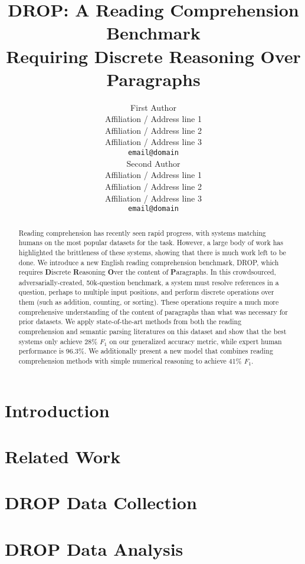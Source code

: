 \documentclass[11pt,a4paper]{article}
\title{DROP: A Reading Comprehension Benchmark \\ Requiring
Discrete Reasoning Over Paragraphs}
\author{First Author \\
  Affiliation / Address line 1 \\
  Affiliation / Address line 2 \\
  Affiliation / Address line 3 \\
  {\tt email@domain} \\\And
  Second Author \\
  Affiliation / Address line 1 \\
  Affiliation / Address line 2 \\
  Affiliation / Address line 3 \\
  {\tt email@domain} \\}
\date{}
\begin{document}
\maketitle
\begin{abstract}

  Reading comprehension has recently seen rapid progress, with systems matching humans on the most popular datasets for the task.  However, a large body of work has highlighted the brittleness of these systems, showing that there is much work left to be done.  We introduce a new English reading comprehension benchmark, DROP, which requires {\bf D}iscrete {\bf R}easoning {\bf O}ver the content of {\bf P}aragraphs.  In this crowdsourced, adversarially-created, 50k-question benchmark, a system must resolve references in a question, perhaps to multiple input positions, and perform discrete operations over them (such as addition, counting, or sorting).  These operations require a much more comprehensive understanding of the content of paragraphs than what was necessary for prior datasets.  We apply state-of-the-art methods from both the reading comprehension and semantic parsing literatures on this dataset and show that the best systems only achieve 28\% $F_1$ on our generalized accuracy metric, while expert human performance is 96.3\%.  We additionally present a new model that combines reading comprehension methods with simple numerical reasoning to achieve 41\% $F_1$.

\end{abstract}

\section{Introduction}
\label{sec:intro}


\section{Related Work}
\label{sec:related_work}


\section{DROP Data Collection}
\label{sec:data_collection}



\section{DROP Data Analysis}
\label{sec:data_analysis}

\end{document}
